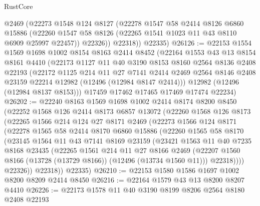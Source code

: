 \begin{lexlean}{RustCore}
\begin{coremodule}
          @2469
          (@22273
            @1548
            @124
            @8127
            (@22278
              @1547
              @58
              @2414
              @8126
              @6860
              @15886
              (@22260 @1547 @58 @8126 (@22265 @1541 @1023 @11 @43 @8110 @6909 @25997 @22457))
              @22326))
          @22318))
      @22335)
@26126 := @22153
    @1554
    @1569
    @1698
    @1002
    @8154
    @8163
    @2414
    @8452
    (@22164
      @1553
      @43
      @13
      @8154
      @8161
      @4410
      (@22173
        @1127
        @11
        @40
        @3190
        @8153
        @8160
        @2564
        @8136
        @2408
        @22193
        (@22172
          @1125
          @214
          @11
          @27
          @7141
          @2414
          @2469
          @2564
          @8146
          @2408
          @23159
          @22214
          @12982
          (@12496 (@12984 @8147 @2414)))
        @12982
        (@12496 (@12984 @8137 @8153)))
      @17459
      @17462
      @17465
      @17469
      @17474
      @22234)
@26202 := @22240
    @8163
    @1569
    @1698
    @1002
    @2414
    @8174
    @8200
    @8450
    (@22252
      @1568
      @126
      @2414
      @8173
      @6857
      @13072
      (@22260
        @1568
        @126
        @8173
        (@22265
          @1566
          @214
          @124
          @27
          @8171
          @2469
          (@22273
            @1566
            @124
            @8171
            (@22278
              @1565
              @58
              @2414
              @8170
              @6860
              @15886
              (@22260
                @1565
                @58
                @8170
                (@23145
                  @1564
                  @11
                  @43
                  @7141
                  @8169
                  @23159
                  (@23421
                    @1563
                    @11
                    @40
                    @7235
                    @8168
                    @23435
                    (@22265
                      @1561
                      @214
                      @11
                      @27
                      @8166
                      @2469
                      (@22207 @1560 @8166 (@13728 (@13729 @8166)) (@12496 (@13734 @1560 @11)))
                      @22318))))
              @22326))
          @22318))
      @22335)
@26210 := @22153 @1580 @1586 @1697 @1002 @8200 @8209 @2414 @8450
@26216 := @22164 @1579 @43 @13 @8200 @8207 @4410
@26226 := @22173 @1578 @11 @40 @3190 @8199 @8206 @2564 @8180 @2408 @22193

\end{coremodule}
\end{lexlean}
